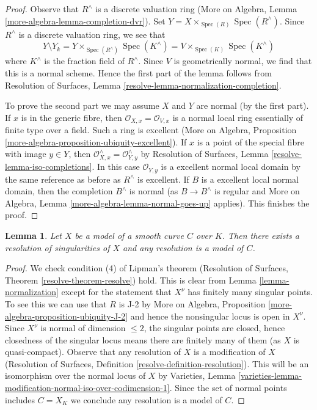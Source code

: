 \documentclass{stacks-project}
\theoremstyle{plain}
\newtheorem{lemma}[subsection]{Lemma}
\theoremstyle{definition}
\theoremstyle{remark}
\numberwithin{equation}{subsection}
\def\Spec{\mathop{\mathrm{Spec}}}
\begin{document}
\begin{proof}
Observe that $R^\wedge$ is a discrete valuation ring
(More on Algebra, Lemma \ref{more-algebra-lemma-completion-dvr}).
Set $Y = X \times_{\Spec(R)} \Spec(R^\wedge)$.
Since $R^\wedge$ is a discrete valuation ring, we see that
$$
Y \setminus Y_k =
Y \times_{\Spec(R^\wedge)} \Spec(K^\wedge) =
V \times_{\Spec(K)} \Spec(K^\wedge)
$$
where $K^\wedge$ is the fraction field of $R^\wedge$.
Since $V$ is geometrically normal, we find that this is
a normal scheme. Hence the first part of the lemma follows from
Resolution of Surfaces, Lemma \ref{resolve-lemma-normalization-completion}.

\medskip\noindent
To prove the second part we may assume $X$ and $Y$ are normal
(by the first part). If $x$ is in the generic fibre, then
$\mathcal{O}_{X, x} = \mathcal{O}_{V, x}$ is a normal local
ring essentially of finite type over a field. Such a ring is
excellent (More on Algebra, Proposition
\ref{more-algebra-proposition-ubiquity-excellent}).
If $x$ is a point of the special fibre with image $y \in Y$, then
$\mathcal{O}_{X, x}^\wedge = \mathcal{O}_{Y, y}^\wedge$
by Resolution of Surfaces, Lemma \ref{resolve-lemma-iso-completions}.
In this case $\mathcal{O}_{Y, y}$ is a excellent normal local domain
by the same reference as before as $R^\wedge$ is excellent.
If $B$ is a excellent local normal domain, then the completion
$B^\wedge$ is normal (as $B \to B^\wedge$ is regular and
More on Algebra, Lemma \ref{more-algebra-lemma-normal-goes-up} applies).
This finishes the proof.
\end{proof}

\begin{lemma}
\label{lemma-regular}
Let $X$ be a model of a smooth curve $C$ over $K$. Then
there exists a resolution of singularities of $X$
and any resolution is a model of $C$.
\end{lemma}

\begin{proof}
We check condition (4) of Lipman's theorem
(Resolution of Surfaces, Theorem \ref{resolve-theorem-resolve}) hold.
This is clear from Lemma \ref{lemma-normalization}
except for the statement that $X^\nu$ has finitely many
singular points. To see this we can use that $R$ is J-2 by
More on Algebra, Proposition \ref{more-algebra-proposition-ubiquity-J-2}
and hence the nonsingular locus is open in $X^\nu$.
Since $X^\nu$ is normal of dimension $\leq 2$, the singular points
are closed, hence closedness of the singular locus
means there are finitely many of them (as $X$ is quasi-compact).
Observe that any resolution of $X$ is a modification of $X$
(Resolution of Surfaces, Definition \ref{resolve-definition-resolution}).
This will be an isomorphism over the normal locus of $X$ by Varieties, Lemma
\ref{varieties-lemma-modification-normal-iso-over-codimension-1}.
Since the set of normal points includes
$C = X_K$ we conclude any resolution is a model of $C$.
\end{proof}
\end{document}
